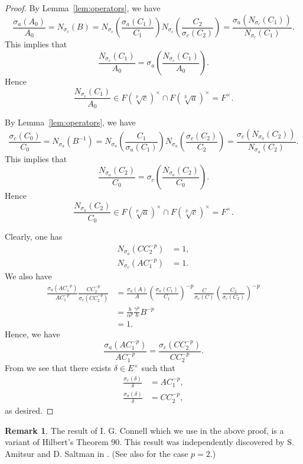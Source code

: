 \documentclass[12pt,leqno]{amsart}
\theoremstyle{plain}
\theoremstyle{definition}
\newtheorem{rmk}[thm]{Remark}
\begin{document}
\begin{proof} By Lemma~\ref{lem:operators}, we have
\[
\frac{\sigma_a(A_0)}{A_0}= N_{\sigma_c}(B) = N_{\sigma_c}\left(\frac{\sigma_a(C_1)}{C_1}\right) N_{\sigma_c}\left(\frac{C_2}{\sigma_c(C_2)}\right)
= \frac{\sigma_a(N_{\sigma_c}(C_1))}{N_{\sigma_c}(C_1)}.
\]
This implies that
\[
\frac{N_{\sigma_c}(C_1)}{A_0}= \sigma_a\left(\frac{N_{\sigma_c}(C_1)}{A_0}\right).
\]
Hence
\[
\dfrac{N_{\sigma_c}(C_1)}{A_0} \in F(\sqrt[p]{c})^\times\cap F(\sqrt[p]{a})^\times=F^\times.
\]

By Lemma~\ref{lem:operators}, we have
\[
\frac{\sigma_c(C_0)}{C_0}= N_{\sigma_a}(B^{-1}) = N_{\sigma_a}\left(\frac{C_1}{\sigma_a(C_1)}\right) N_{\sigma_a}\left(\frac{\sigma_c(C_2)}{C_2}\right)
= \frac{\sigma_c(N_{\sigma_a}(C_2))}{N_{\sigma_a}(C_2)}.
\]
This implies that
\[
\frac{N_{\sigma_a}(C_2)}{C_0}= \sigma_c\left(\frac{N_{\sigma_a}(C_2)}{C_0}\right).
\]
Hence
\[
\dfrac{N_{\sigma_a}(C_2)}{C_0} \in F(\sqrt[p]{a})^\times\cap F(\sqrt[p]{c})^\times=F^\times.
\]

 Clearly, one  has
\[
\begin{aligned}
N_{\sigma_a}(CC_2^{-p})&=1,\\
N_{\sigma_c}(A C_1^{-p})&=1.
\end{aligned}
\]
We also have
\[
\begin{aligned}
\frac{\sigma_a(AC_1^{-p})}{AC_1^{-p}}
 \frac{CC_2^{-p}}{\sigma_c(CC_2^{-p})}&= \frac{\sigma_a(A)}{A} \left(\frac{\sigma_a(C_1)}{C_1}\right)^{-p} \frac{C}{\sigma_c(C)}\left(\frac{C_2}{\sigma_c(C_2)}\right)^{-p}\\
&= \frac{b}{\alpha^p}\frac{\gamma^p}{b} B^{-p}\\
&=1.
\end{aligned}
\]
Hence, we have
\[
\frac{\sigma_a(AC_1^{-p})}{AC_1^{-p}}= \frac{\sigma_c(CC_2^{-p})}{CC_2^{-p}}.
\]
From \cite[page 756]{Co} we see that there exists $\delta \in E^\times$ such that 
\[
\begin{aligned}
\frac{\sigma_c(\delta)}{\delta}&= A C_1^{-p},\\
\frac{\sigma_a(\delta)}{\delta}&=C C_2^{-p},
\end{aligned}
\]
as desired.
\end{proof}
\begin{rmk}
 The result of I. G. Connell which we use in the above proof, is a variant of Hilbert's Theorem 90. This result was independently discovered by S. Amitsur and D. Saltman in \cite[Lemma 2.4]{AS}. (See also  \cite[Theorem 2]{DMSS} for the case $p=2$.)
\end{rmk}
\end{document}
